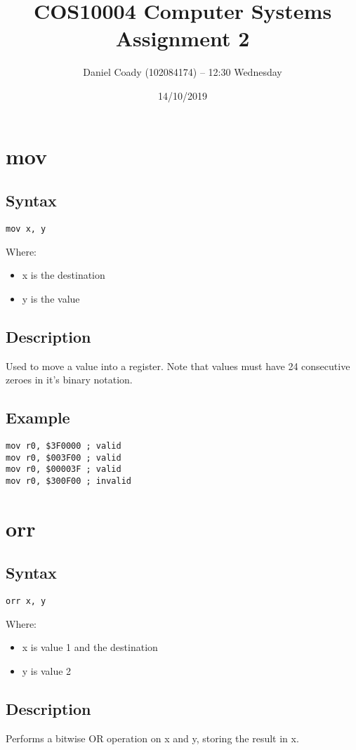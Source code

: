 \documentclass[11pt]{scrartcl}
\title{COS10004 Computer Systems Assignment 2}
\author{Daniel Coady (102084174) -- 12:30 Wednesday}
\date{14/10/2019}
\begin{document}
\maketitle

\pagebreak

\section{mov}
\subsection{Syntax}
\begin{verbatim}
mov x, y
\end{verbatim}
Where:
\begin{itemize}
    \item x is the destination
    \item y is the value
\end{itemize}
\subsection{Description}
Used to move a value into a register. Note that values must have 24
consecutive zeroes in it's binary notation.
\subsection{Example}
\begin{verbatim}
mov r0, $3F0000 ; valid
mov r0, $003F00 ; valid
mov r0, $00003F ; valid
mov r0, $300F00 ; invalid
\end{verbatim}

\section{orr}
\subsection{Syntax}
\begin{verbatim}
orr x, y
\end{verbatim}
Where:
\begin{itemize}
    \item x is value 1 and the destination
    \item y is value 2
\end{itemize}
\subsection{Description}
Performs a bitwise OR operation on x and y, storing the result in x.
\end{document}
